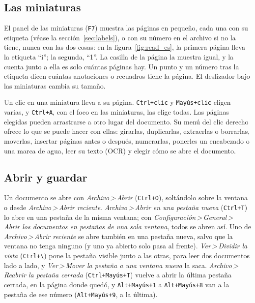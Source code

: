 \documentclass[12pt,
              article,
              oneside
              ]{memoir}
\newcommand*{\menu}[1]{\textit{#1}}
\newcommand*{\then}{\,>\,}
\newcommand*{\key}[1]{\texttt{#1}}
\begin{document}
\subsection{Las miniaturas}

%
El panel de las miniaturas (\key{F7}) muestra las páginas en pequeño, cada
una con su etiqueta (véase la sección~\ref{sec:labels}), o con su número
en el archivo si no la tiene, nunca con las dos cosas: en la
figura~\ref{fig:read_es}, la primera página lleva la etiqueta
\enquote{i}; la segunda, \enquote{1}. La casilla de la página la muestra
igual, y la cuenta junto a ella es solo cuántas páginas hay. Un punto y un
número tras la etiqueta dicen cuántas anotaciones o recuadros tiene la
página. El deslizador bajo las miniaturas cambia su tamaño.

%
Un clic en una miniatura lleva a su página. \key{Ctrl+clic} y
\key{Mayús+clic} eligen varias, y \key{Ctrl+A}, con el foco en las
miniaturas, las elige todas. Las páginas elegidas pueden arrastrarse a otro
lugar del documento. Su menú del clic derecho ofrece lo que se puede hacer
con ellas: girarlas, duplicarlas, extraerlas o borrarlas, moverlas,
insertar páginas antes o después, numerarlas, ponerles un encabezado o una
marca de agua, leer su texto (OCR) y elegir cómo se abre el documento.

\subsection{Abrir y guardar}

%
Un documento se abre con \menu{Archivo\then Abrir} (\key{Ctrl+O}),
soltándolo sobre la ventana o desde \menu{Archivo\then Abrir reciente}.
\menu{Archivo\then Abrir en una pestaña nueva} (\key{Ctrl+T}) lo abre en
una pestaña de la misma ventana; con \menu{Configuración\then General\then
Abrir los documentos en pestañas de una sola ventana}, todos se abren así.
Uno de \menu{Archivo\then Abrir reciente} se abre también en una pestaña
nueva, salvo que la ventana no tenga ninguno (y uno ya abierto solo pasa al
frente).
\menu{Ver\then Dividir la vista} (\key{Ctrl+\textbackslash}) pone la
pestaña visible junto a las otras, para leer dos documentos lado a lado, y
\menu{Ver\then Mover la pestaña a una ventana nueva} la saca.
\menu{Archivo\then Reabrir la pestaña cerrada} (\key{Ctrl+Mayús+T}) vuelve a
abrir la última pestaña cerrada, en la página donde quedó, y
\key{Alt+Mayús+1} a \key{Alt+Mayús+8} van a la pestaña de ese número
(\key{Alt+Mayús+9}, a la última).
\end{document}
